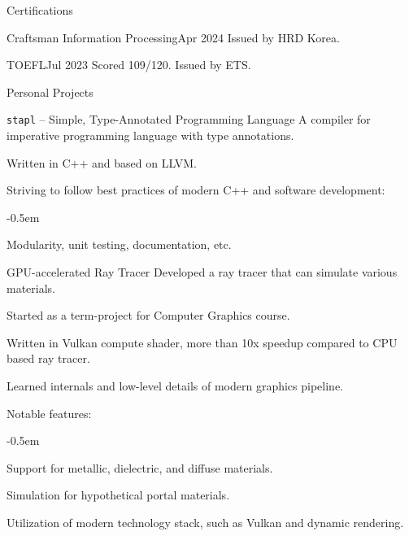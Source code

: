 \documentclass{resume}
\begin{document}
\begin{res-section}{Certifications}
  \begin{res-subsection}{Craftsman Information Processing}{Apr 2024}
    Issued by HRD Korea.
  \end{res-subsection}

  \begin{res-subsection}{TOEFL}{Jul 2023}
    Scored 109/120. Issued by ETS.
  \end{res-subsection}
\end{res-section}

\begin{res-section}{Personal Projects}
  \begin{res-subsection}{\texttt{stapl} -- Simple, Type-Annotated Programming Language}{}
    A compiler for imperative programming language with type annotations.

    \item Written in C++ and based on LLVM.

    \item Striving to follow best practices of modern C++ and software development:
    \vspace{-0.5em}
    \begin{list}{--}{}
      \itemsep -0.5em
      \item Modularity, unit testing, documentation, etc.
    \end{list}
  \end{res-subsection}

  \begin{res-subsection}{GPU-accelerated Ray Tracer}{}
    Developed a ray tracer that can simulate various materials.

    \item Started as a term-project for Computer Graphics course.

    \item Written in Vulkan compute shader, more than 10x speedup compared to CPU based ray tracer.

    \item Learned internals and low-level details of modern graphics pipeline.

    \item Notable features:
    \vspace{-0.5em}
    \begin{list}{--}{}
      \itemsep -0.5em
      \item Support for metallic, dielectric, and diffuse materials.
      \item Simulation for hypothetical portal materials.
      \item Utilization of modern technology stack, such as Vulkan and dynamic rendering.
    \end{list}
  \end{res-subsection}


\end{res-section}
\end{document}
